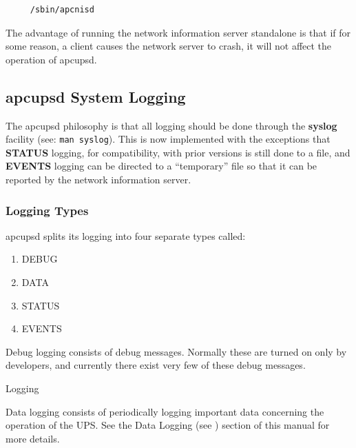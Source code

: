 {{{{{{{{{{\begin{verbatim}
     /sbin/apcnisd
\end{verbatim}
\normalsize

The advantage of running the network information server standalone is that if
for some reason, a client causes the network server to crash, it will not
affect the operation of apcupsd. 

\label{apcupsd-System-Logging}

\subsection*{apcupsd System Logging}

\label{index-Logging_002c-System-166}
\label{index-System-Logging-167}
The apcupsd philosophy is that all logging should be done through the {\bf
syslog} facility (see: {\tt man syslog}). This is now implemented with the
exceptions that {\bf STATUS} logging, for compatibility, with prior versions
is still done to a file, and {\bf EVENTS} logging can be directed to a
``temporary'' file so that it can be reported by the network information
server. 

\label{Logging-Types}

\subsubsection*{Logging Types}

\label{index-Logging_002c-types-168}
apcupsd splits its logging into four separate types called:  

\begin{enumerate}
\item DEBUG  
\item DATA  
\item STATUS  
\item EVENTS  
\end{enumerate}

Debug logging consists of debug messages. Normally these are turned on only by
developers, and currently there exist very few of these debug messages. 

{\smallDATA Logging}

Data logging consists of periodically logging important data concerning the
operation of the UPS. See the Data Logging (see 
) section of this manual for more
details. 

}}}}}}}}}}
